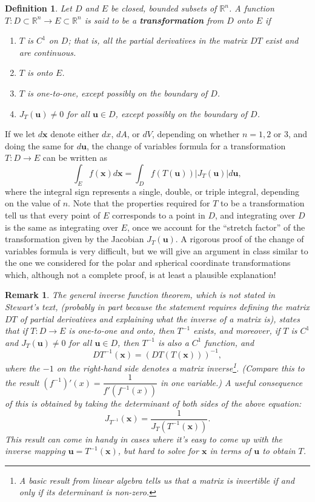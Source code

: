 \documentclass[12pt,letterpaper]{article}
\newtheorem{rem}[theorem]{Remark}
\newenvironment{remark}{\begin{rem}\rm}{\end{rem}}
\newtheorem{definition}[theorem]{Definition}
\newcommand{\R}{\mathbb{R}}
\newcommand{\x}{\mathbf{x}}
\newcommand{\uu}{\mathbf{u}}
\begin{document}
\begin{definition}
Let $D$ and $E$ be closed, bounded subsets of $\R^n$. A function $T:D\subset \R^n\to E\subset \R^n$ is said to be a {\bf transformation} from $D$ onto $E$ if
\begin{enumerate}
\item $T$ is  $C^1$ on $D$; that is, all the partial derivatives in the matrix $DT$ exist and are continuous.
\item $T$ is onto $E$.
\item $T$ is one-to-one, except possibly on the boundary of $D$.
\item $J_T(\uu)\neq 0$ for all $\uu\in D$, except possibly on the boundary of $D$.
\end{enumerate}
\end{definition}
If we let $d\x$ denote either $dx$, $dA$, or $dV$, depending on whether $n=1,2$ or 3, and doing the same for  $d\uu$, the change of variables formula for a transformation $T:D\to E$ can be written as
\[
\int_E f(\x)d\x = \int_D f(T(\uu))\lvert J_T(\uu)\rvert d\uu,
\]
where the integral sign represents a single, double, or triple integral, depending on the value of $n$. Note that the properties required for $T$ to be a transformation tell us that every point of $E$ corresponds to a point in $D$, and integrating over $D$ is the same as integrating over $E$, once we account for the ``stretch factor'' of the transformation given by the Jacobian $J_T(\uu)$. A rigorous proof of the change of variables formula is very difficult, but we will give an argument in class similar to the one we considered for the polar and spherical coordinate transformations which, although not a complete proof, is at least a plausible explanation!

\begin{remark}
The general inverse function theorem, which is not stated in Stewart's text, (probably in part because the statement requires defining the matrix $DT$ of partial derivatives and explaining what the inverse of a matrix is), states that if $T:D\to E$ is one-to-one and onto, then $T^{-1}$ exists, and moreover, if $T$ is $C^1$ {\em and} $J_T(\uu)\neq 0$ for all $\uu\in D$, then $T^{-1}$ is {\em also} a $C^1$ function, and
\[
DT^{-1}(\x) = (DT(T(\x)))^{-1},
\]
where the $-1$ on the right-hand side denotes a matrix inverse\footnote{A basic result from linear algebra tells us that a matrix is invertible if and only if its determinant is non-zero.}. (Compare this to the result $(f^{-1})'(x) = \dfrac{1}{f'(f^{-1}(x))}$ in one variable.) A useful consequence of this is obtained by taking the determinant of both sides of the above equation:
\[
J_{T^{-1}}(\x) = \frac{1}{J_T(T^{-1}(\x))}.
\]
This result can come in handy in cases where it's easy to come up with the inverse mapping $\uu = T^{-1}(\x)$, but hard to solve for $\x$ in terms of $\uu$ to obtain $T$.
\end{remark}
\end{document}
